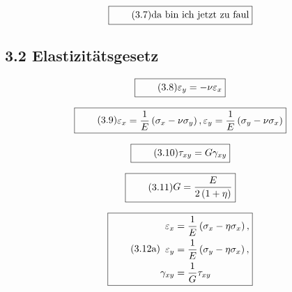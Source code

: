 \documentclass[11pt]{article}
\newcommand{\1}{ {\mathds{1}} }
\begin{document}
    \begin{equation}
      \boxed{
        \tag{3.7}
        \begin{split}
          \text{da bin ich jetzt zu faul}
        \end{split}
      }
    \end{equation}

    \subsection*{3.2 Elastizitätsgesetz}

    \begin{equation}
      \boxed{
        \tag{3.8}
        \begin{split}
			\varepsilon_y = -\nu \varepsilon_x
        \end{split}
      }
    \end{equation}

    \begin{equation}
      \boxed{
        \tag{3.9}
        \begin{split}
			\varepsilon_x = \frac{1}{E} \left( \sigma_x - \nu\sigma_y \right), 
			\varepsilon_y = \frac{1}{E} \left( \sigma_y - \nu\sigma_x \right)
        \end{split}
      }
    \end{equation}

    \begin{equation}
      \boxed{
        \tag{3.10}
        \begin{split}
			\tau_{xy} = G \gamma_{xy}
        \end{split}
      }
    \end{equation}

    \begin{equation}
      \boxed{
        \tag{3.11}
        \begin{split}
        	G = \frac{E}{2\left(1+\eta\right)}
        \end{split}
      }
    \end{equation}

    \begin{equation}
      \boxed{
        \tag{3.12a}
        \begin{split}
        	\varepsilon_x &= \frac{1}{E}\left(\sigma_x - \eta \sigma_x\right),
        	\\
        	\varepsilon_y &= \frac{1}{E}\left(\sigma_y - \eta \sigma_x\right),
        	\\
			\gamma_{xy} &= \frac{1}{G}\tau_{xy}
        \end{split}
      }
    \end{equation}
\end{document}
